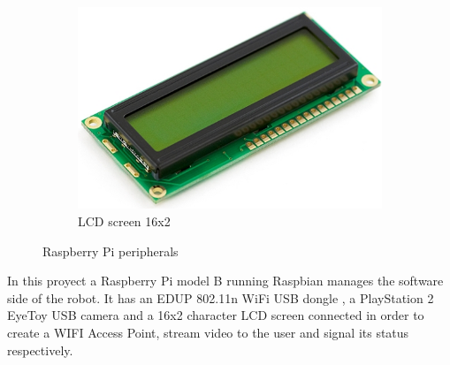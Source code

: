 \begin{figure}[H]
\begin{subfigure}[b]{0.3\textwidth}
		      	\includegraphics[scale=0.25]{images/ProjectComponents/lcd.jpg}
				\caption{LCD screen 16x2}
		        \label{}
		    \end{subfigure}
		    \caption{Raspberry Pi peripherals}
		    \label{}
		\end{figure}


	In this proyect a Raspberry Pi model B running Raspbian manages the software side of the robot. It has an EDUP 802.11n WiFi USB dongle , a PlayStation 2 EyeToy USB camera and a 16x2 character LCD screen connected in order to create a WIFI Access Point, stream video to the user and signal its status respectively.







